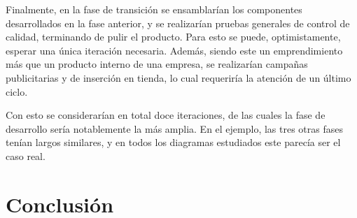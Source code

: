 \documentclass[spanish]{udpreport}
\begin{document}
Finalmente, en la fase de transición se ensamblarían los componentes desarrollados en la fase anterior, y se realizarían pruebas generales de control de calidad, terminando de pulir el producto. Para esto se puede, optimistamente, esperar una única iteración necesaria. Además, siendo este un emprendimiento más que un producto interno de una empresa, se realizarían campañas publicitarias y de inserción en tienda, lo cual requeriría la atención de un último ciclo. \par
Con esto se considerarían en total doce iteraciones, de las cuales la fase de desarrollo sería notablemente la más amplia. En el ejemplo, las tres otras fases tenían largos similares, y en todos los diagramas estudiados este parecía ser el caso real.

\chapter{Conclusión}


\end{document}
